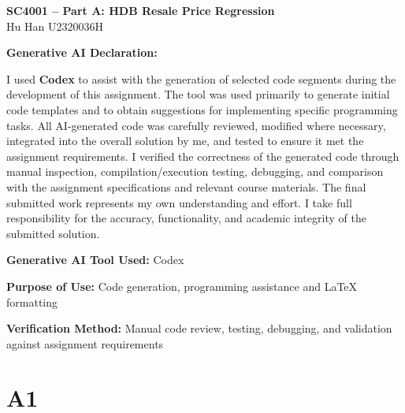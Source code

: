 \documentclass[10pt,a4paper]{article}
\begin{document}
\begin{center}{\large\bfseries SC4001 -- Part A: HDB Resale Price Regression}\\Hu Han \quad U2320036H\end{center}

\textbf{Generative AI Declaration:}

I used \textbf{Codex} to assist with the generation of selected code segments during the development of this assignment. The tool was used primarily to generate initial code templates and to obtain suggestions for implementing specific programming tasks. All AI-generated code was carefully reviewed, modified where necessary, integrated into the overall solution by me, and tested to ensure it met the assignment requirements. I verified the correctness of the generated code through manual inspection, compilation/execution testing, debugging, and comparison with the assignment specifications and relevant course materials. The final submitted work represents my own understanding and effort. I take full responsibility for the accuracy, functionality, and academic integrity of the submitted solution.

\textbf{Generative AI Tool Used:} Codex

\textbf{Purpose of Use:} Code generation, programming assistance and LaTeX formatting

\textbf{Verification Method:} Manual code review, testing, debugging, and validation against assignment requirements

\section*{A1}
\end{document}
